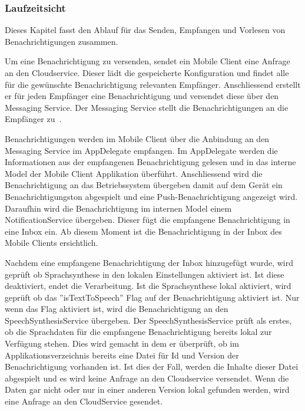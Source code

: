 \subsubsection{Laufzeitsicht}

Dieses Kapitel fasst den Ablauf für das Senden, Empfangen und Vorlesen von Benachrichtigungen zusammen.

Um eine Benachrichtigung zu versenden, sendet ein Mobile Client eine Anfrage an den Cloudservice.
Dieser lädt die gespeicherte Konfiguration und findet alle für die gewünschte Benachrichtigung relevanten Empfänger.
Anschliessend erstellt er für jeden Empfänger eine Benachrichtigung und versendet diese über den Messaging Service.
Der Messaging Service stellt die Benachrichtigungen an die Empfänger zu~\cite{ip5}.

Benachrichtigungen werden im Mobile Client über die Anbindung an den Messaging Service im AppDelegate empfangen.
Im AppDelegate werden die Informationen aus der empfangenen Benachrichtigung gelesen und in das interne Model der Mobile Client Applikation überführt.
Anschliessend wird die Benachrichtigung an das Betriebssystem übergeben damit auf dem Gerät ein Benachrichtigungston abgespielt und eine Push-Benachrichtigung angezeigt wird.
Daraufhin wird die Benachrichtigung im internen Model einem NotificationService übergeben.
Dieser fügt die empfangene Benachrichtigung in eine Inbox ein.
Ab diesem Moment ist die Benachrichtigung in der Inbox des Mobile Clients ersichtlich.

Nachdem eine empfangene Benachrichtigung der Inbox hinzugefügt wurde, wird geprüft ob Sprachsynthese in den lokalen Einstellungen aktiviert ist.
Ist diese deaktiviert, endet die Verarbeitung.
Ist die Sprachsynthese lokal aktiviert, wird geprüft ob das ''isTextToSpeech'' Flag auf der Benachrichtigung aktiviert ist.
Nur wenn das Flag aktiviert ist, wird die Benachrichtigung an den SpeechSynthesisService übergeben.
Der SpeechSynthesisService prüft als erstes, ob die Sprachdaten für die empfangene Benachrichtigung bereits lokal zur Verfügung stehen.
Dies wird gemacht in dem er überprüft, ob im Applikationsverzeichnis bereits eine Datei für Id und Version der Benachrichtigung vorhanden ist.
Ist dies der Fall, werden die Inhalte dieser Datei abgespielt und es wird keine Anfrage an den Cloudservice versendet.
Wenn die Daten gar nicht oder nur in einer anderen Version lokal gefunden werden, wird eine Anfrage an den CloudService gesendet.

